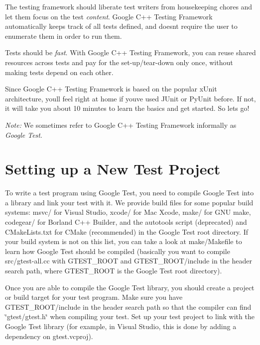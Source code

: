 \begin{DoxyEnumerate}
\item The testing framework should liberate test writers from housekeeping chores and let them focus on the test {\itshape content}. Google C++ Testing Framework automatically keeps track of all tests defined, and doesn\textquotesingle{}t require the user to enumerate them in order to run them.
\end{DoxyEnumerate}
\begin{DoxyEnumerate}
\item Tests should be {\itshape fast}. With Google C++ Testing Framework, you can reuse shared resources across tests and pay for the set-\/up/tear-\/down only once, without making tests depend on each other.
\end{DoxyEnumerate}

Since Google C++ Testing Framework is based on the popular x\+Unit architecture, you\textquotesingle{}ll feel right at home if you\textquotesingle{}ve used J\+Unit or Py\+Unit before. If not, it will take you about 10 minutes to learn the basics and get started. So let\textquotesingle{}s go!

{\itshape Note\+:} We sometimes refer to Google C++ Testing Framework informally as {\itshape Google Test}.

\section*{Setting up a New Test Project}

To write a test program using Google Test, you need to compile Google Test into a library and link your test with it. We provide build files for some popular build systems\+: {\ttfamily msvc/} for Visual Studio, {\ttfamily xcode/} for Mac Xcode, {\ttfamily make/} for G\+NU make, {\ttfamily codegear/} for Borland C++ Builder, and the autotools script (deprecated) and {\ttfamily C\+Make\+Lists.\+txt} for C\+Make (recommended) in the Google Test root directory. If your build system is not on this list, you can take a look at {\ttfamily make/\+Makefile} to learn how Google Test should be compiled (basically you want to compile {\ttfamily src/gtest-\/all.\+cc} with {\ttfamily G\+T\+E\+S\+T\+\_\+\+R\+O\+OT} and {\ttfamily G\+T\+E\+S\+T\+\_\+\+R\+O\+O\+T/include} in the header search path, where {\ttfamily G\+T\+E\+S\+T\+\_\+\+R\+O\+OT} is the Google Test root directory).

Once you are able to compile the Google Test library, you should create a project or build target for your test program. Make sure you have {\ttfamily G\+T\+E\+S\+T\+\_\+\+R\+O\+O\+T/include} in the header search path so that the compiler can find {\ttfamily \char`\"{}gtest/gtest.\+h\char`\"{}} when compiling your test. Set up your test project to link with the Google Test library (for example, in Visual Studio, this is done by adding a dependency on {\ttfamily gtest.\+vcproj}).

